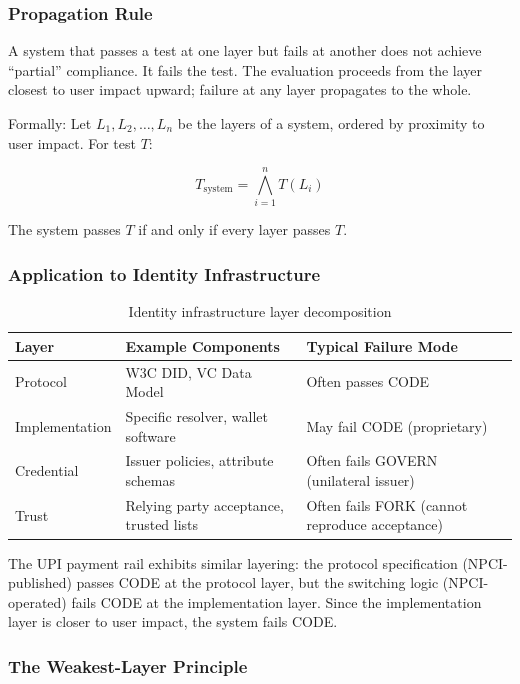 \subsubsection{Propagation Rule}

A system that passes a test at one layer but fails at another does not achieve ``partial'' compliance. It fails the test. The evaluation proceeds from the layer closest to user impact upward; failure at any layer propagates to the whole.

Formally: Let $L_1, L_2, \ldots, L_n$ be the layers of a system, ordered by proximity to user impact. For test $T$:

\begin{equation}
T_{\text{system}} = \bigwedge_{i=1}^{n} T(L_i)
\end{equation}

The system passes $T$ if and only if every layer passes $T$.

\subsubsection{Application to Identity Infrastructure}

\begin{table}[htbp]
\centering
\small
\begin{tabular}{@{}llp{5cm}@{}}
\toprule
\textbf{Layer} & \textbf{Example Components} & \textbf{Typical Failure Mode} \\
\midrule
Protocol & W3C DID, VC Data Model & Often passes CODE \\
Implementation & Specific resolver, wallet software & May fail CODE (proprietary) \\
Credential & Issuer policies, attribute schemas & Often fails GOVERN (unilateral issuer) \\
Trust & Relying party acceptance, trusted lists & Often fails FORK (cannot reproduce acceptance) \\
\bottomrule
\end{tabular}
\caption{Identity infrastructure layer decomposition}
\label{tab:identity_layers}
\end{table}

The UPI payment rail exhibits similar layering: the protocol specification (NPCI-published) passes CODE at the protocol layer, but the switching logic (NPCI-operated) fails CODE at the implementation layer. Since the implementation layer is closer to user impact, the system fails CODE.

\subsubsection{The Weakest-Layer Principle}

